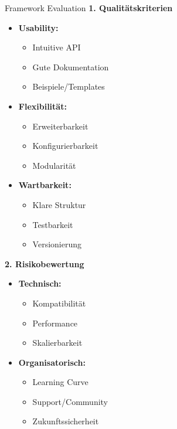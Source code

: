 \begin{KR}{Framework Evaluation}
\textbf{1. Qualitätskriterien}
\begin{itemize}
    \item \textbf{Usability:}
    \begin{itemize}
        \item Intuitive API
        \item Gute Dokumentation
        \item Beispiele/Templates
    \end{itemize}
    
    \item \textbf{Flexibilität:}
    \begin{itemize}
        \item Erweiterbarkeit
        \item Konfigurierbarkeit
        \item Modularität
    \end{itemize}
    
    \item \textbf{Wartbarkeit:}
    \begin{itemize}
        \item Klare Struktur
        \item Testbarkeit
        \item Versionierung
    \end{itemize}
\end{itemize}

\textbf{2. Risikobewertung}
\begin{itemize}
    \item \textbf{Technisch:}
    \begin{itemize}
        \item Kompatibilität
        \item Performance
        \item Skalierbarkeit
    \end{itemize}
    
    \item \textbf{Organisatorisch:}
    \begin{itemize}
        \item Learning Curve
        \item Support/Community
        \item Zukunftssicherheit
    \end{itemize}
\end{itemize}
\end{KR}



